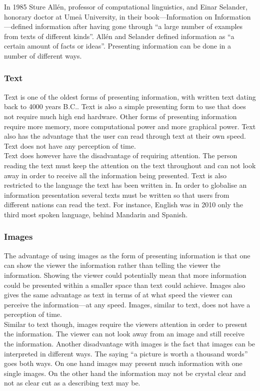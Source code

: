 In 1985 Sture All{\'e}n, professor of computational linguistics, and Einar Selander, honorary doctor at Ume{\aa} University, in their book---Information on Information---defined information after having gone through ``a large number of examples from texts of different kinds''. All{\'e}n and Selander defined information as ``a certain amount of facts or ideas''.\cite{informationDef1} Presenting information can be done in a number of different ways.

\subsubsection{Text}
Text is one of the oldest forms of presenting information, with written text dating back to 4000 years B.C..\cite{cuneiform} Text is also a simple presenting form to use that does not require much high end hardware. Other forms of presenting information require more memory, more computational power and more graphical power. Text also has the advantage that the user can read through text at their own speed. Text does not have any perception of time.\\

Text does however have the disadvantage of requiring attention. The person reading the text must keep the attention on the text throughout and can not look away in order to receive all the information being presented. Text is also restricted to the language the text has been written in. In order to globalise an information presentation several texts must be written so that users from different nations can read the text. For instance, English was in 2010 only the third most spoken language, behind Mandarin and Spanish.\cite{sprakNe}

\subsubsection{Images}
The advantage of using images as the form of presenting information is that one can show the viewer the information rather than telling the viewer the information. Showing the viewer could potentially mean that more information could be presented within a smaller space than text could achieve. Images also gives the same advantage as text in terms of at what speed the viewer can perceive the information---at any speed. Images, similar to text, does not have a perception of time.\\

Similar to text though, images require the viewers attention in order to present the information. The viewer can not look away from an image and still receive the information. Another disadvantage with images is the fact that images can be interpreted in different ways. The saying ``a picture is worth a thousand words'' goes both ways. On one hand images may present much information with one single images. On the other hand the information may not be crystal clear and not as clear cut as a describing text may be.

